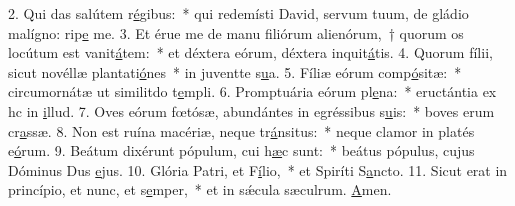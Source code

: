 2. Qui das salútem r\uline{é}gibus:~* qui redemísti David, servum tuum, de gládio malígno: rip\uline{e} me.
3. Et érue me de manu filiórum alienórum,~† quorum os locútum est vanit\uline{á}tem:~* et déxtera eórum, déxtera inquit\uline{á}tis.
4. Quorum fílii, sicut novéllæ plantati\uline{ó}nes~* in juventte s\uline{u}a.
5. Fíliæ eórum comp\uline{ó}sitæ:~* circumornátæ ut similitdo t\uline{e}mpli.
6. Promptuária eórum pl\uline{e}na:~* eructántia ex hc in \uline{i}llud.
7. Oves eórum fœtósæ, abundántes in egréssibus s\uline{u}is:~* boves erum cr\uline{a}ssæ.
8. Non est ruína macériæ, neque tr\uline{á}nsitus:~* neque clamor in platés e\uline{ó}rum.
9. Beátum dixérunt pópulum, cui h\uline{æ}c sunt:~* beátus pópulus, cujus Dóminus Dus \uline{e}jus.
10. Glória Patri, et F\uline{í}lio,~* et Spiríti S\uline{a}ncto.
11. Sicut erat in princípio, et nunc, et s\uline{e}mper,~* et in sǽcula sæculrum. \uline{A}men.
